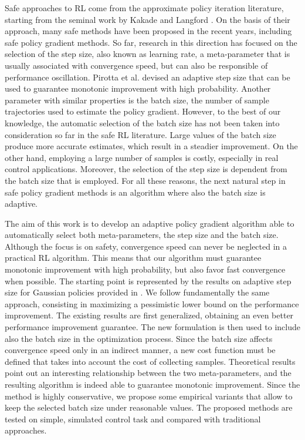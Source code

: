Safe approaches to \ac{RL} come from the approximate policy iteration literature, starting from the seminal work by Kakade and Langford \cite{kakade2002approximately}. On the basis of their approach, many safe methods have been proposed in the recent years, including safe policy gradient methods. So far, research in this direction has focused on the selection of the step size, also known as learning rate, a meta-parameter that is usually associated with convergence speed, but can also be responsible of performance oscillation. Pirotta et al. \cite{pirotta2015policy} devised an adaptive step size that can be used to guarantee monotonic improvement with high probability. 
Another parameter with similar properties is the batch size, the number of sample trajectories used to estimate the policy gradient. However, to the best of our knowledge, the automatic selection of the batch size has not been taken into consideration so far in the safe \ac{RL} literature.
Large values of the batch size produce more accurate estimates, which result in a steadier improvement. On the other hand, employing a large number of samples is costly, especially in real control applications. Moreover, the selection of the step size is dependent from the batch size that is employed. For all these reasons, the next natural step in safe policy gradient methods is an algorithm where also the batch size is adaptive.  

The aim of this work is to develop an adaptive policy gradient algorithm able to automatically select both meta-parameters, the step size and the batch size. Although the focus is on safety, convergence speed can never be neglected in a practical \ac{RL} algorithm. This means that our algorithm must guarantee monotonic improvement with high probability, but also favor fast convergence when possible. The starting point is represented by the results on adaptive step size for Gaussian policies provided in \cite{pirotta2015policy}. We follow fundamentally the same approach, consisting in maximizing a pessimistic lower bound on the performance improvement. The existing results are first generalized, obtaining an even better performance improvement guarantee. The new formulation is then used to include also the batch size in the optimization process. Since the batch size affects convergence speed only in an indirect manner, a new cost function must be defined that takes into account the cost of collecting samples. Theoretical results point out an interesting relationship between the two meta-parameters, and the resulting algorithm is indeed able to guarantee monotonic improvement. Since the method is highly conservative, we propose some empirical variants that allow to keep the selected batch size under reasonable values. The proposed methods are tested on simple, simulated control task and compared with traditional approaches.

